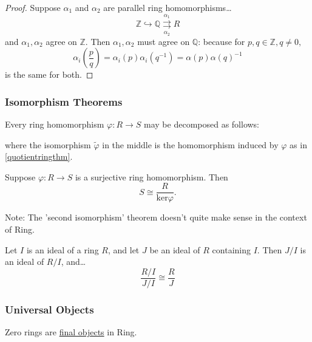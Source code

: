 \begin{proof}
Suppose $\alpha_1$ and $\alpha_2$ are parallel ring homomorphisms\dots
$$\mathbb{Z} \hookrightarrow \mathbb{Q} \underset{\alpha_2}{\overset{\alpha_1}{\rightrightarrows}} R$$
and $\alpha_1, \alpha_2$ agree on $\mathbb{Z}$. Then $\alpha_1, \alpha_2$ must agree on $\mathbb{Q}$: because
for $p,q \in \mathbb{Z}, q \neq 0,$
$$\alpha_i\left(\frac{p}{q}\right) = \alpha_i(p)\alpha_i(q^{-1})=\alpha(p)\alpha(q)^{-1}$$
is the same for both.
\end{proof}

\subsubsection{Isomorphism Theorems}\label{ringisomorphismtheorems}

\begin{theorem}
\label{ringcanonicaldecomposition}
Every ring homomorphism $\varphi : R \rightarrow S$ may be decomposed as follows:

\begin{figure}[H]
  \centering
  
\end{figure}

\noindent where the isomorphism $\tilde \varphi$ in the middle is the homomorphism induced by $\varphi$ as in \ref{quotientringthm}.
\end{theorem}

\begin{corollary}
Suppose $\varphi : R \rightarrow S$ is a surjective ring homomorphism. Then
$$S \cong \frac{R}{\textrm{ker}\varphi}.$$
\end{corollary}

\noindent Note: The 'second isomorphism' theorem doesn't quite make sense in the context of Ring.

\begin{theorem}
Let $I$ is an ideal of a ring $R$, and let $J$ be an ideal of $R$ containing $I$. Then $J/I$ is an ideal of $R/I$,
and\dots
$$\frac{R/I}{J/I} \cong \frac{R}{J}$$
\end{theorem}

\subsubsection{Universal Objects}

\begin{proposition}
Zero rings are \hyperref[final]{final objects} in Ring.
\end{proposition}

